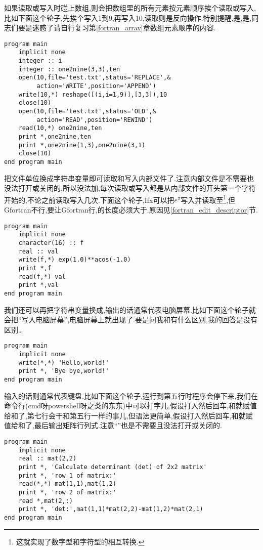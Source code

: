 如果读取或写入时碰上数组,则会把数组里的所有元素按元素顺序挨个读取或写入,比如下面这个轮子,先挨个写入1到9,再写入10,读取则是反向操作.特别提醒,是,是,同志们要是迷惑了请自行复习第\ref{fortran_array}章数组元素顺序的内容.
\begin{lstlisting}
program main
    implicit none
    integer :: i
    integer :: one2nine(3,3),ten
    open(10,file='test.txt',status='REPLACE',&
         action='WRITE',position='APPEND')
    write(10,*) reshape([(i,i=1,9)],[3,3]),10
    close(10)
    open(10,file='test.txt',status='OLD',&
         action='READ',position='REWIND')
    read(10,*) one2nine,ten
    print *,one2nine,ten
    print *,one2nine(1,3),one2nine(3,1)
    close(10)
end program main
\end{lstlisting}

把文件单位换成字符串变量即可读取和写入内部文件了.注意内部文件是不需要也没法打开或关闭的,所以没法加,每次读取或写入都是从内部文件的开头第一个字符开始的,不论之前读取写入几次.下面这个轮子,Ifx可以把$e^\pi$写入并读取至\footnote{这就实现了数字型和字符型的相互转换.},但Gfortran不行,要让Gfortran行,的长度必须大于.原因见\ref{fortran_edit_descriptor}节.\label{internal_file}
\begin{lstlisting}
program main
    implicit none
    character(16) :: f
    real :: val
    write(f,*) exp(1.0)**acos(-1.0)
    print *,f
    read(f,*) val
    print *,val
end program main
\end{lstlisting}

我们还可以再把字符串变量换成\ttt{*},输出的话\ttt{*}通常代表电脑屏幕.比如下面这个轮子就会把``写入电脑屏幕'',电脑屏幕上就出现了.要是问我和有什么区别,我的回答是没有区别\dots
\begin{lstlisting}
program main
    implicit none
    write(*,*) 'Hello,world!'
    print *, 'Bye bye,world!'
end program main
\end{lstlisting}
输入的话\ttt{*}则通常代表键盘.比如下面这个轮子,运行到第五行时程序会停下来,我们在命令行(cmd呀powershell呀之类的东东)中可以打字儿,假设打入然后回车,和就赋值给和了,第七行会干和第五行一样的事儿,但语法更简单,假设打入然后回车,和就赋值给和了,最后输出矩阵行列式.注意``\ttt{*}''也是不需要且没法打开或关闭的.
\begin{lstlisting}
program main
    implicit none
    real :: mat(2,2)
    print *, 'Calculate determinant (det) of 2x2 matrix'
    print *, 'row 1 of matrix:'
    read(*,*) mat(1,1),mat(1,2)
    print *, 'row 2 of matrix:'
    read *,mat(2,:)
    print *, 'det:',mat(1,1)*mat(2,2)-mat(1,2)*mat(2,1)
end program main
\end{lstlisting}

